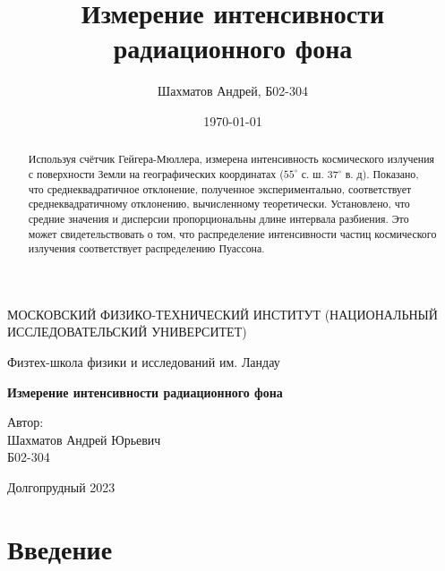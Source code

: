 \documentclass[12pt]{article}
\title{Измерение интенсивности радиационного фона}
\author{Шахматов Андрей, Б02-304}
\date{\today}
\begin{document}
\begin{titlepage}
    \begin{center}
        {\large МОСКОВСКИЙ ФИЗИКО-ТЕХНИЧЕСКИЙ ИНСТИТУТ (НАЦИОНАЛЬНЫЙ ИССЛЕДОВАТЕЛЬСКИЙ УНИВЕРСИТЕТ)}
    \end{center}
    \begin{center}
        {\large Физтех-школа физики и исследований им. Ландау}
    \end{center}
    
    
    \vspace{3cm}
    {\huge
        \begin{center}
            \textbf{Измерение интенсивности радиационного фона}
        \end{center}
    }
    \vspace{2cm}
    \begin{flushright}
        {\LARGE Автор:\\ Шахматов Андрей Юрьевич \\
            \vspace{0.2cm}
            Б02-304}
    \end{flushright}
    \vspace{7 cm}
    \begin{center}
        Долгопрудный 2023
    \end{center}
\end{titlepage}


\begin{abstract}
    Используя счётчик Гейгера-Мюллера, измерена интенсивность космического излучения с поверхности Земли на 
    географических координатах ($55^\circ$ с. ш. $37^\circ$ в. д). Показано, что среднеквадратичное отклонение, полученное экспериментально,
    соответствует среднеквадратичному отклонению, вычисленному теоретически. Установлено, что средние значения и дисперсии 
    пропорциональны длине интервала разбиения. Это может свидетельствовать о том, что распределение интенсивности частиц космического 
    излучения соответствует распределению Пуассона.
\end{abstract}

\tableofcontents

\section{Введение}
\end{document}
